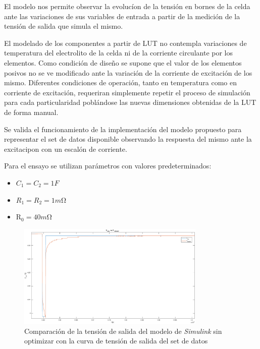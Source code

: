 \documentclass[10pt,a4paper]{article}
\begin{document}
El modelo nos permite observar la evolucíon de la tensión en bornes de la celda
ante las variaciones de sus variables de entrada a partir de la medición de la
tensi\'on de salida que simula el mismo.

El modelado de los componentes a partir de \acrshort{LUT} no contempla
variaciones de temperatura del electrolito de la celda ni de la corriente
circulante por los elementos. Como condición de diseño se supone que el valor de
los elementos posivos no se ve modificado ante la variación de la corriente de
excitación de los mismo. Diferentes condiciones de operación, tanto en
temperatura como en corriente de excitación, requeriran simplemente repetir el
proceso de simulación para cada particularidad poblándose las nuevas dimensiones
obtenidas de la \acrshort{LUT} de forma manual.

Se valida el funcionamiento de la implementación del modelo propuesto para
representar el set de datos disponible observando la respuesta del mismo ante la
excitacipon con un escal\'on de corriente.

Para el ensayo se utilizan par\'ametros con valores predeterminados: 

\begin{itemize}
    \item $C_{1} = C_{2} = 1F$
    \item $ R_{1} = R_{2} = 1m\mathrm{\Omega}$
    \item $\mathrm{R_0}=40m\mathrm{\Omega}$
\end{itemize}

\begin{figure}[h!]
    \begin{center}
        \includegraphics[width=0.8\textwidth]{v_sim_v_dataset_no_opt.eps}
        \caption{Comparaci\'on de la tensi\'on de salida del modelo de
                 \emph{Simulink} sin optimizar con la curva de tensi\'on de 
                 salida del set de datos}
         \label{comp_simulink_no_opt}
    \end{center}
\end{figure}
\end{document}
